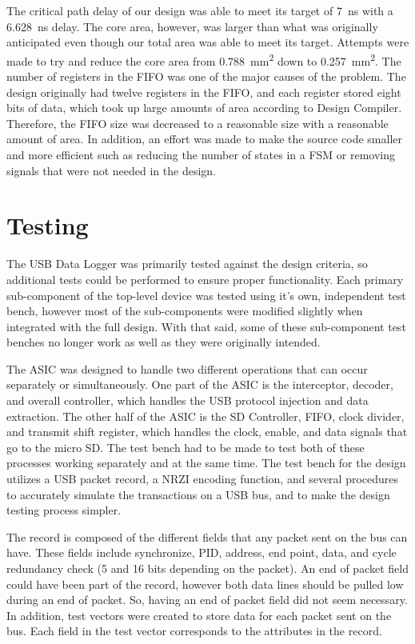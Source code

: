 \documentclass[12pt,letter,oneside]{report}
\begin{document}
The critical path delay of our design was able to meet its target of \SI{7}{\nano\second} with a \SI{6.628}{\nano\second} delay. The core area, however, was larger than what was originally anticipated even though our total area was able to meet its target. Attempts were made to try and reduce the core area from \SI{0.788}{\milli\meter\squared} down to \SI{0.257}{\milli\meter\squared}. The number of registers in the FIFO was one of the major causes of the problem. The design originally had twelve registers in the FIFO, and each register stored eight bits of data, which took up large amounts of area according to Design Compiler. Therefore, the FIFO size was decreased to a reasonable size with a reasonable amount of area. In addition, an effort was made to make the source code smaller and more efficient such as reducing the number of states in a FSM or removing signals that were not needed in the design.
\chapter{Testing}
The USB Data Logger was primarily tested against the design criteria, so additional tests could be performed to ensure proper functionality. Each primary sub-component of the top-level device was tested using it's own, independent test bench, however most of the sub-components were modified slightly when integrated with the full design. With that said, some of these sub-component test benches no longer work as well as they were originally intended.

The ASIC was designed to handle two different operations that can occur separately or simultaneously. One part of the ASIC is the interceptor, decoder, and overall controller, which handles the USB protocol injection and data extraction. The other half of the ASIC is the SD Controller, FIFO, clock divider, and transmit shift register, which handles the clock, enable, and data signals that go to the micro SD. The test bench had to be made to test both of these processes working separately and at the same time. The test bench for the design utilizes a USB packet record, a NRZI encoding function, and several procedures to accurately simulate the transactions on a USB bus, and to make the design testing process simpler.

The record is composed of the different fields that any packet sent on the bus can have. These fields include synchronize, PID, address, end point, data, and cycle redundancy check (5 and 16 bits depending on the packet). An end of packet field could have been part of the record, however both data lines should be pulled low during an end of packet. So, having an end of packet field did not seem necessary. In addition, test vectors were created to store data for each packet sent on the bus. Each field in the test vector corresponds to the attributes in the record.
\end{document}
